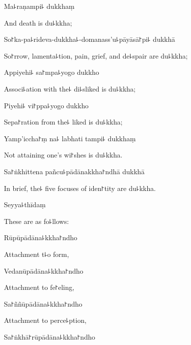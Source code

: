 Ma꜕raṇampi꜕ dukkhaṃ

\begin{english}
  And death is du꜕kkha;
\end{english}

So꜓ka-pa꜕rideva-dukkha꜕-domanass'u꜕pāyāsā꜓pi꜕ dukkhā

\begin{english}
  So꜓rrow, lamenta꜕tion, pain, grief, and de꜕spair are du꜕kkha;
\end{english}

Appiyehi꜕ sa꜓mpa꜕yogo dukkho

\begin{english}
  Associ꜕ation with the꜕ di꜕sliked is du꜕kkha;
\end{english}

Piyehi꜕ vi꜓ppa꜕yogo dukkho

\begin{english}
  Sepa꜓ration from the꜕ liked is du꜕kkha;
\end{english}

Yamp'iccha꜓ṃ na꜕ labhati tampi꜕ dukkhaṃ

\begin{english}
  Not attaining one's wi꜓shes is du꜕kkha.
\end{english}

Sa꜓ṅkhittena pañcu꜕pādānakkha꜓ndhā dukkhā

\begin{english}
  In brief, the꜕ five focuses of iden꜓tity are du꜕kkha.
\end{english}

Seyya꜕thīdaṃ

\begin{english}
  These are as fo꜕llows:
\end{english}

Rūpūpādāna꜕kkha꜓ndho

\begin{english}
  Attachment t꜕o form,
\end{english}

Vedanūpādāna꜕kkha꜓ndho

\begin{english}
  Attachment to fe꜓eling,
\end{english}

Sa꜓ññūpādāna꜕kkha꜓ndho

\begin{english}
  Attachment to perce꜕ption,
\end{english}

Sa꜓ṅkhā꜓rūpādāna꜕kkha꜓ndho

